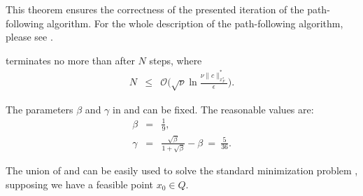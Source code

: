 This theorem ensures the correctness of the presented iteration of the path-following algorithm. For the whole description of the path-following algorithm, please see .



\begin{theorem}
   terminates no more than after $N$ steps, where
  \begin{eqnarray}
    N &\leq& \mathcal{O}\Bigg(\sqrt{\nu}\ln\frac{\nu \|c\|^*_{x^*_F}}{\epsilon}\Bigg).
  \end{eqnarray}
\end{theorem}

The parameters $\beta$ and $\gamma$ in  and  can be fixed. The reasonable values are:
\begin{eqnarray}
  \beta &=& \frac{1}{9},\\
  \gamma &=& \frac{\sqrt{\beta}}{1+\sqrt{\beta}} - \beta\ =\ \frac{5}{36}.
\end{eqnarray}

The union of  and  can be easily used to solve the standard minimization problem , supposing we have a feasible point $x_0\in Q$.

